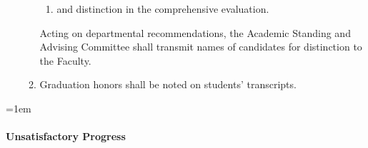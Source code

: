 \documentclass{manual}
\let\oldparagraph\paragraph
\renewcommand\paragraph{\leftskip=1em\oldparagraph}
\newcommand{\itemLevelA}{\alph*.}
\newcommand{\itemLevelB}{\arabic*)}
\newcommand{\itemRefA}{\alph*}
\newcommand{\itemRefB}{\arabic*}
\begin{document}
\begin{enumerate}[label=\itemLevelA,ref=\itemRefA]
\begin{enumerate}[label=\itemLevelB,ref=\itemRefB]
\begin{enumerate}[label=\alph*)]
\item and distinction in the comprehensive evaluation.
\end{enumerate}

Acting on departmental recommendations, the Academic Standing and Advising Committee shall transmit names of candidates for distinction to the Faculty.

\item Graduation honors shall be noted on students' transcripts.
\end{enumerate}

\end{enumerate}

\paragraph{Unsatisfactory Progress}\label{par:UnsatisfactoryProgress}
\end{document}
